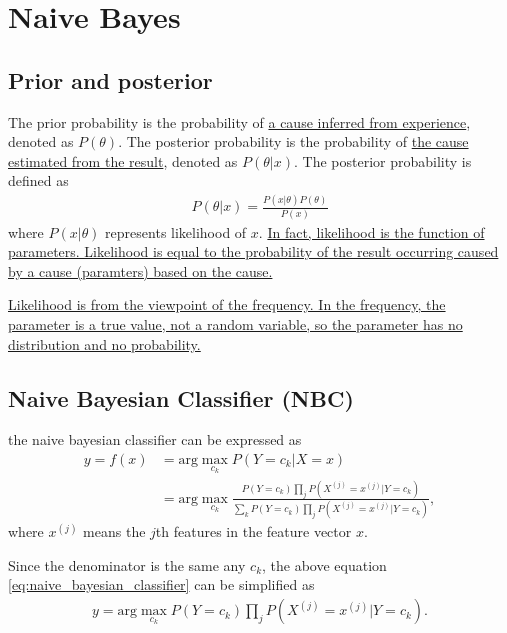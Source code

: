 \documentclass[10pt,onecolumn]{book}
\begin{document}
\section{Naive Bayes}
\subsection{Prior and posterior}
The prior probability is the probability of \uline{a cause inferred from experience}, denoted as $P(\theta)$. The posterior probability is the probability of \uline{the cause estimated from the result}, denoted as $P(\theta|x)$. The posterior probability is defined as 
\begin{equation}\label{eq:posterior}
\begin{split}
P(\theta|x) = \frac{P(x|\theta) P(\theta)}{P(x)}
\end{split}
\end{equation}
where $P(x|\theta)$ represents likelihood of $x$. \uline{In fact, likelihood is the function of parameters. Likelihood is equal to the probability of the result occurring caused by a cause (paramters) based on the cause.} 

\uline{Likelihood is from the viewpoint of the frequency. In the frequency, the parameter is a true value, not a random variable, so the parameter has no distribution and no probability.}

\subsection{Naive Bayesian Classifier (NBC)}
the naive bayesian classifier can be expressed as
\begin{equation}\label{eq:naive_bayesian_classifier}
\begin{split}
y = f(x) & = \text{arg}\max_{c_k} P(Y = c_k | X = x) \\
		& = \text{arg}\max_{c_k} \frac{P(Y = c_k) \prod_j P(X^{(j)} = x^{(j)} | Y = c_k)}{\sum_k P(Y = c_k) \prod_j P(X^{(j)} = x^{(j)} | Y = c_k)},
\end{split}
\end{equation}
where $x^{(j)}$ means the $j$th features in the feature vector $x$. 

Since the denominator is the same any $c_k$, the above equation \ref{eq:naive_bayesian_classifier} can be simplified as 
\begin{equation}
\begin{split}
y = \text{arg}\max_{c_k} P(Y = c_k) \prod_j P(X^{(j)} = x^{(j)} | Y = c_k).
\end{split}
\end{equation}
\end{document}
